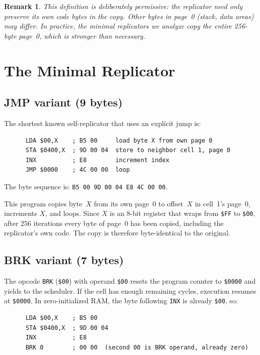 \documentclass{article}
\newcommand{\hex}[1]{\texttt{\$#1}}
\newcommand{\opcode}[1]{\texttt{#1}}
\newtheorem{remark}{Remark}
\begin{document}
\begin{remark}
This definition is deliberately permissive: the replicator need only
preserve its own code bytes in the copy. Other bytes in page~0 (stack,
data areas) may differ. In practice, the minimal replicators we analyze
copy the entire 256-byte page~0, which is stronger than necessary.
\end{remark}

\section{The Minimal Replicator}
\label{sec:minimal}

\subsection{JMP variant (9 bytes)}

The shortest known self-replicator that uses an explicit jump is:

\begin{lstlisting}
      LDA $00,X    ; B5 00     load byte X from own page 0
      STA $0400,X  ; 9D 00 04  store to neighbor cell 1, page 0
      INX          ; E8        increment index
      JMP $0000    ; 4C 00 00  loop
\end{lstlisting}

The byte sequence is: \texttt{B5 00 9D 00 04 E8 4C 00 00}.

This program copies byte~$X$ from its own page~0 to offset~$X$ in
cell~1's page~0, increments $X$, and loops. Since $X$ is an 8-bit
register that wraps from \hex{FF} to \hex{00}, after 256 iterations
every byte of page~0 has been copied, including the replicator's own
code. The copy is therefore byte-identical to the original.

\subsection{BRK variant (7 bytes)}

The opcode \opcode{BRK} (\hex{00}) with operand \hex{00} resets the
program counter to \hex{0000} and yields to the scheduler. If the cell
has enough remaining cycles, execution resumes at \hex{0000}. In
zero-initialized RAM, the byte following \opcode{INX} is already
\hex{00}, so:

\begin{lstlisting}
      LDA $00,X    ; B5 00
      STA $0400,X  ; 9D 00 04
      INX          ; E8
      BRK 0        ; 00 00  (second 00 is BRK operand, already zero)
\end{lstlisting}
\end{document}
